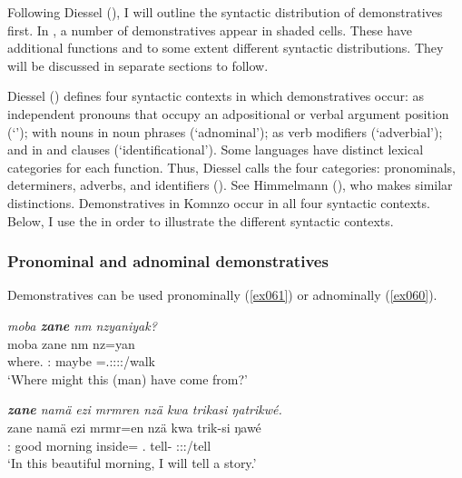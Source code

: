 Following Diessel (\citeyear{Diessel:2009tg}), I will outline the syntactic distribution of demonstratives first. In , a number of demonstratives appear in shaded cells. These have additional functions and to some extent different syntactic distributions. They will be discussed in separate sections to follow.%

Diessel (\citeyear{Diessel:2009tg}) defines four syntactic contexts in which demonstratives occur: as independent pronouns that occupy an adpositional or verbal argument position (`'); with nouns in noun phrases (`adnominal'); as verb modifiers (`adverbial'); and in  and  clauses (`identificational'). Some languages have distinct lexical categories for each function. Thus, Diessel calls the four categories:  pronominals,  determiners,  adverbs, and  identifiers (\citeyear[3]{Diessel:2009tg}). See Himmelmann (\citeyear{Himmelmann:1996tp}), who makes similar distinctions. Demonstratives in Komnzo occur in all four syntactic contexts. Below, I use the  in order to illustrate the different syntactic contexts.%

\subsubsection{Pronominal and adnominal demonstratives} \label{demprondet}

Demonstratives can be used pronominally (\ref{ex061}) or adnominally (\ref{ex060}).

\begin{exe}
	\ex \emph{moba \textbf{zane} nm nzyaniyak?}\\
	\gll moba zane nm nz=yan\\
	where.\Abl{} \Dem:\Prox{} maybe \Immpst=\Tsg.\Masc:\Sbj:\Nonpast:\Ipfv:\Venit/walk\\
	\trans `Where might this (man) have come from?' 
	\label{ex061}
\end{exe}
\begin{exe}
	\ex \emph{\textbf{zane} namä ezi mrmren nzä kwa trikasi ŋatrikwé.}\\
	\gll zane namä ezi mrmr=en nzä kwa trik-si ŋawé\\
	\Dem:\Prox{} good morning inside=\Loc{} \Fsg.\Abs{} \Fut{} tell-\Nmlz{} \Fsg:\Sbj:\Nonpast:\Ipfv/tell\\
	\trans `In this beautiful morning, I will tell a story.' 
	\label{ex060}
\end{exe}

